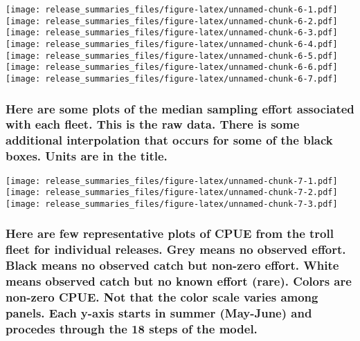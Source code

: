 \documentclass[]{article}
\begin{document}
\texttt{[image: release\_summaries\_files/figure-latex/unnamed-chunk-6-1.pdf]}
\texttt{[image: release\_summaries\_files/figure-latex/unnamed-chunk-6-2.pdf]}
\texttt{[image: release\_summaries\_files/figure-latex/unnamed-chunk-6-3.pdf]}
\texttt{[image: release\_summaries\_files/figure-latex/unnamed-chunk-6-4.pdf]}
\texttt{[image: release\_summaries\_files/figure-latex/unnamed-chunk-6-5.pdf]}
\texttt{[image: release\_summaries\_files/figure-latex/unnamed-chunk-6-6.pdf]}
\texttt{[image: release\_summaries\_files/figure-latex/unnamed-chunk-6-7.pdf]}

\newpage

\hypertarget{here-are-some-plots-of-the-median-sampling-effort-associated-with-each-fleet.-this-is-the-raw-data.-there-is-some-additional-interpolation-that-occurs-for-some-of-the-black-boxes.-units-are-in-the-title.}{%
\subsubsection{Here are some plots of the median sampling effort
associated with each fleet. This is the raw data. There is some
additional interpolation that occurs for some of the black boxes. Units
are in the
title.}\label{here-are-some-plots-of-the-median-sampling-effort-associated-with-each-fleet.-this-is-the-raw-data.-there-is-some-additional-interpolation-that-occurs-for-some-of-the-black-boxes.-units-are-in-the-title.}}

\texttt{[image: release\_summaries\_files/figure-latex/unnamed-chunk-7-1.pdf]}
\texttt{[image: release\_summaries\_files/figure-latex/unnamed-chunk-7-2.pdf]}
\texttt{[image: release\_summaries\_files/figure-latex/unnamed-chunk-7-3.pdf]}

\newpage

\hypertarget{here-are-few-representative-plots-of-cpue-from-the-troll-fleet-for-individual-releases.-grey-means-no-observed-effort.-black-means-no-observed-catch-but-non-zero-effort.-white-means-observed-catch-but-no-known-effort-rare.-colors-are-non-zero-cpue.-not-that-the-color-scale-varies-among-panels.-each-y-axis-starts-in-summer-may-june-and-procedes-through-the-18-steps-of-the-model.}{%
\subsubsection{Here are few representative plots of CPUE from the troll
fleet for individual releases. Grey means no observed effort. Black
means no observed catch but non-zero effort. White means observed catch
but no known effort (rare). Colors are non-zero CPUE. Not that the color
scale varies among panels. Each y-axis starts in summer (May-June) and
procedes through the 18 steps of the
model.}\label{here-are-few-representative-plots-of-cpue-from-the-troll-fleet-for-individual-releases.-grey-means-no-observed-effort.-black-means-no-observed-catch-but-non-zero-effort.-white-means-observed-catch-but-no-known-effort-rare.-colors-are-non-zero-cpue.-not-that-the-color-scale-varies-among-panels.-each-y-axis-starts-in-summer-may-june-and-procedes-through-the-18-steps-of-the-model.}}
\end{document}
